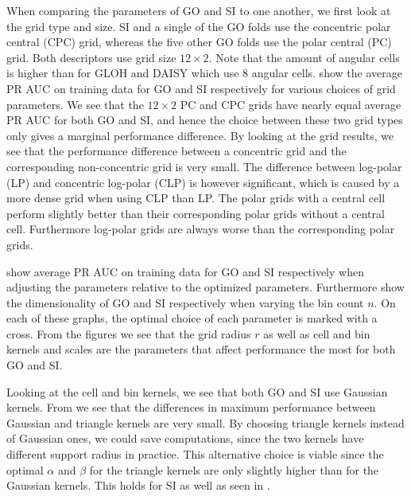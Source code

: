 \documentclass[thesis.tex]{subfiles}
\begin{document}
When comparing the parameters of GO and SI to one another, we first look at the grid type and size.  SI and a single of the GO folds use the concentric polar central (CPC) grid, whereas the five other GO folds use the polar central (PC) grid. Both descriptors use grid size $12 \times 2$. Note that the amount of angular cells is higher than for GLOH and DAISY which use 8 angular cells.  show the average PR AUC on training data for GO and SI respectively for various choices of grid parameters. We see that the $12\times2$ PC and CPC grids have nearly equal average PR AUC for both GO and SI, and hence the choice between these two grid types only gives a marginal performance difference. By looking at the grid results, we see that the performance difference between a concentric grid and the corresponding non-concentric grid is very small. The difference between log-polar (LP) and concentric log-polar (CLP) is however significant, which is caused by a more dense grid when using CLP than LP.
The polar grids with a central cell perform slightly better than their corresponding polar grids without a central cell. Furthermore log-polar grids are always worse than the corresponding polar grids.

 show average PR AUC on training data for GO and SI respectively when adjusting the parameters relative to the optimized parameters. Furthermore  show the dimensionality of GO and SI respectively when varying the bin count $n$. On each of these graphs, the optimal choice of each parameter is marked with a cross. From the figures we see that the grid radius $r$ as well as cell and bin kernels and scales are the parameters that affect performance the most for both GO and SI.


Looking at the cell and bin kernels, we see that both GO and SI use Gaussian kernels. From  we see that the differences in maximum performance between Gaussian and triangle kernels are very small. By choosing triangle kernels instead of Gaussian ones, we could save computations, since the two kernels have different support radius in practice. This alternative choice is viable since the optimal $\alpha$ and $\beta$ for the triangle kernels are only slightly higher than for the Gaussian kernels.
This holds for SI as well as seen in .
\end{document}
